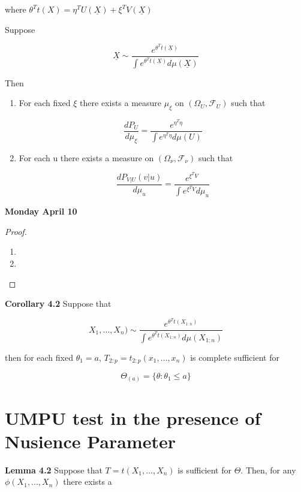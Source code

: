 \documentclass[11pt,fleqn]{book} %
\begin{document}
where $\theta^T t(X) = \eta^T U(\underline{X}) + \xi^T V(\underline{X})$

\begin{theorem}
	Suppose

			$$\underline{X} \sim \frac{e^{\theta^T t(\underline{X})}}{\int e^{\theta^T t(\underline{X})} d\mu(\underline{X})} $$

	Then 

	\begin{enumerate}
		\item For each fixed $\xi$ there exists a measure $\mu_\xi$ on $(\Omega_U, \mathcal{F}_U)$ such that

				$$\frac{d P_U}{d\mu_\xi} = \frac{e^{\eta^T \eta}}{\int e^{\eta^T \eta} d\mu(U)} $$
		\item For each u there exists a measure on $(\Omega_\nu, \mathcal{F}_\nu)$ such that

				$$\frac{d P_{V|U}(v|u)}{d \mu_u} = \frac{e^{\xi^TV}}{\int e^{\xi^T V} d\mu_u} $$
	\end{enumerate}


\end{theorem}

\textbf{Monday April 10}\\

\begin{proof}
	\begin{enumerate}
		\item
		\item  
	\end{enumerate}
\end{proof}

\textbf{Corollary 4.2} Suppose that

		$$X_1, \dots, X_n) \sim \frac{e^{\theta^T t(X_{1:n})}}{\int e^{\theta^T t(X_{1:n})} d\mu(X_{1:n})} $$

then for each fixed $\theta_1 = a$, $T_{2:p} = t_{2:p}(x_1, \dots, x_n)$ is complete sufficient for 

		$$\Theta_{(a)} = \{\theta: \theta_1 \leq a \} $$

\section{UMPU test in the presence of Nusience Parameter}

\textbf{Lemma 4.2} Suppose that $T = t(X_1, \dots, X_n)$ is sufficient for $\Theta$. Then, for any $\phi(X_1, \dots, X_n)$ there exists a 
\end{document}
